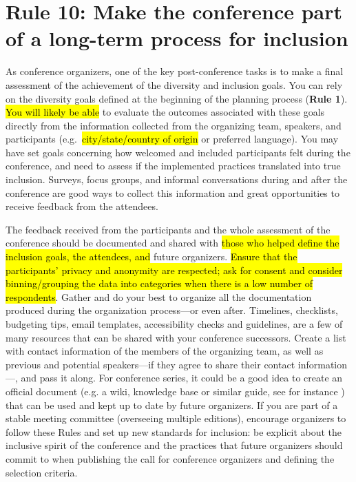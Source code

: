 \documentclass[10pt,letterpaper]{article}
\begin{document}
\section*{Rule 10: Make the conference part of a long-term process for inclusion}
\label{rule_process}

As conference organizers, one of the key post-conference tasks is to make a final assessment of the achievement of the diversity and inclusion goals. 
You can rely on the diversity goals defined at the beginning of the planning process (\textbf{Rule 1}). 
\hl{You will likely be able} to evaluate the outcomes associated with these goals directly from the information collected from the organizing team, speakers, and participants (e.g.\ \hl{city/state/country of origin} or preferred language).
You may have set goals concerning how welcomed and included participants felt during the conference, and need to assess if the implemented practices translated into true inclusion. 
Surveys, focus groups, and informal conversations during and after the conference are good ways to collect this information and great opportunities to receive feedback from the attendees. 

The feedback received from the participants and the whole assessment of the conference should be documented and shared with \hl{those who helped define the inclusion goals, the attendees, and} future organizers. 
\hl{Ensure that the participants' privacy and anonymity are respected; ask for consent and consider binning/grouping the data into categories when there is a low number of respondents}.
Gather and do your best to organize all the documentation produced during the organization process---or even after. Timelines, checklists, budgeting tips, email templates, accessibility checks and guidelines, are a few of many resources that can be shared with your conference successors. 
Create a list with contact information of the members of the organizing team, as well as previous and potential speakers---if they agree to share their contact information---, and pass it along.
For conference series, it could be a good idea to create an official document (e.g. a wiki, knowledge base or similar guide, see for instance \cite{sanchez-tapia_user_2021-2}) that can be used and kept up to date by future organizers.
If you are part of a stable meeting committee (overseeing multiple editions), encourage organizers to follow these Rules and set up new standards for inclusion: be explicit about the inclusive spirit of the conference and the practices that future organizers should commit to when publishing the call for conference organizers and defining the selection criteria. 
\end{document}
